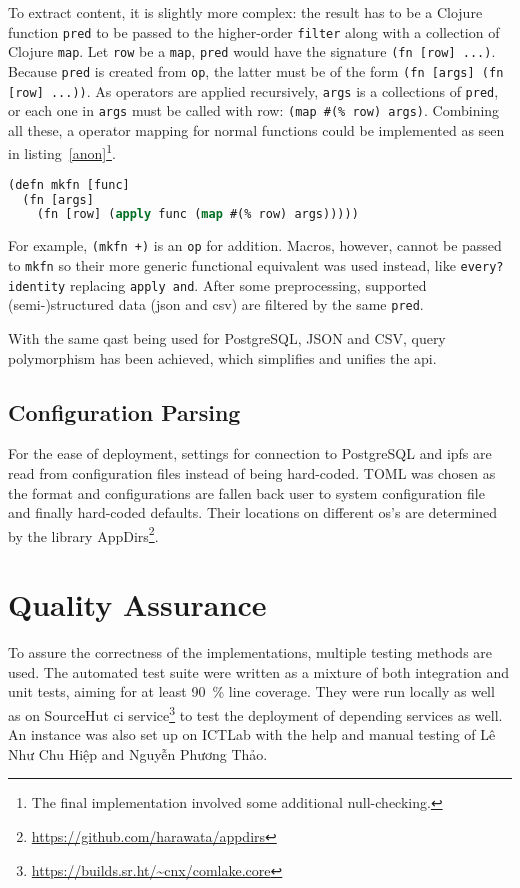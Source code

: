 To extract content, it is slightly more complex: the result has to be
a Clojure function \verb|pred| to be passed to the higher-order \verb|filter|
along with a collection of Clojure \verb|map|.  Let \verb|row| be
a \verb|map|, \verb|pred| would have the signature \verb|(fn [row] ...)|.
Because \verb|pred| is created from \verb|op|, the latter must be of the form
\verb|(fn [args] (fn [row] ...))|.  As operators are applied recursively,
\verb|args| is a collections of \verb|pred|, or each one in \verb|args|
must be called with row: \verb|(map #(% row) args)|.  Combining all these,
a operator mapping for normal functions could be implemented as seen in
listing~\ref{anon}\footnote{The final implementation involved some additional
null-checking.}.
\begin{lstlisting}[label=anon,caption=Constructing a function returning
  another one lazily applying given the given one,language=lisp]
(defn mkfn [func]
  (fn [args]
    (fn [row] (apply func (map #(% row) args)))))
\end{lstlisting}

For example, \verb|(mkfn +)| is an \verb|op| for addition.  Macros, however,
cannot be passed to \verb|mkfn| so their more generic functional equivalent
was used instead, like \verb|every? identity| replacing \verb|apply and|.
After some preprocessing, supported (semi-)structured data (\gls{json}
and \gls{csv}) are filtered by the same \verb|pred|.

With the same \gls{qast} being used for PostgreSQL, JSON and CSV,
query polymorphism has been achieved, which simplifies and unifies
the \gls{api}.

\subsection{Configuration Parsing}
For the ease of deployment, settings for connection to PostgreSQL
and \gls{ipfs} are read from configuration files instead of being hard-coded.
TOML was chosen as the format and configurations are fallen back
user to system configuration file and finally hard-coded defaults.
Their locations on different \gls{os}'s are determined by the library
AppDirs\footnote{\url{https://github.com/harawata/appdirs}}.

\section{Quality Assurance}
To assure the correctness of the implementations, multiple testing methods
are used.  The automated test suite were written as a mixture of
both integration and unit tests, aiming for at least \SI{90}{\percent}
line coverage.  They were run locally as well as on SourceHut \gls{ci}
service\footnote{\url{https://builds.sr.ht/~cnx/comlake.core}}
to test the deployment of depending services as well.  An instance
was also set up on ICTLab with the help and manual testing
of {Lê Như Chu Hiệp and Nguyễn Phương Thảo}.
